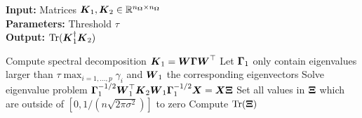 \hspace*{\algorithmicindent} \textbf{Input:} Matrices $\boldsymbol{K}_1, \boldsymbol{K}_2 \in \mathbb{R}^{n_{\boldsymbol{\Omega}} \times n_{\boldsymbol{\Omega}}}$ \\
\hspace*{\algorithmicindent} \textbf{Parameters:} Threshold $\tau$ \\
\hspace*{\algorithmicindent} \textbf{Output:} $\operatorname{Tr}(\boldsymbol{K}_1^{\dagger} \boldsymbol{K}_2)$
\begin{algorithmic}[1]
    \State Compute spectral decomposition $\boldsymbol{K}_1 = \boldsymbol{W} \boldsymbol{\Gamma} \boldsymbol{W}^{\top}$
    \State Let $\boldsymbol{\Gamma}_1$ only contain eigenvalues larger than $\tau \max_{i=1, \dots, p} \gamma_i$ and $\boldsymbol{W}_1$ the corresponding eigenvectors
    \State Solve eigenvalue problem $\boldsymbol{\Gamma}_1^{-1/2} \boldsymbol{W}_1^{\top} \boldsymbol{K}_2 \boldsymbol{W}_1 \boldsymbol{\Gamma}_1^{-1/2} \boldsymbol{X} = \boldsymbol{X} \boldsymbol{\Xi}$
    \State Set all values in $\boldsymbol{\Xi}$ which are outside of $[0, 1 / (n \sqrt{2 \pi \sigma^2})]$ to zero
    \State Compute $\operatorname{Tr}(\boldsymbol{\Xi})$
\end{algorithmic}
